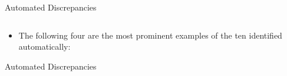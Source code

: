 \documentclass{beamer}
\begin{document}
\begin{frame}{Automated Discrepancies}
\begin{columns}[c]
\begin{column}{.4\textwidth}
        \end{column}
    \end{columns} \pause
    \vspace{-0.25cm}
    \begin{itemize}
        \item The following four are the most prominent examples of the ten
              identified automatically:
    \end{itemize}
\end{frame}

\begin{frame}{Automated Discrepancies}
    \begin{enumerate}
        
    \end{enumerate}
\end{frame}


%   



\end{document}
